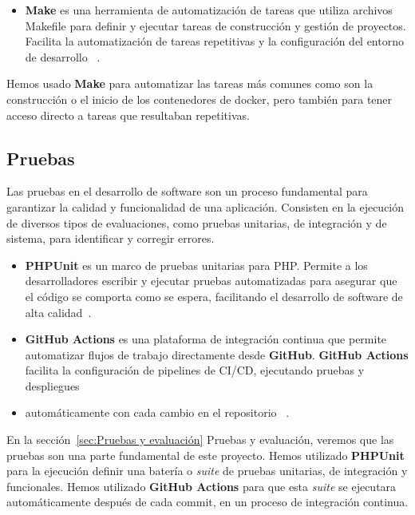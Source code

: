 \begin{itemize}
    \item \textbf{Make}
    es una herramienta de automatización de tareas que utiliza archivos Makefile para definir y ejecutar tareas de
    construcción y gestión de proyectos.
    Facilita la automatización de tareas repetitivas y la configuración del entorno de desarrollo
    ~\cite{https://www.gnu.org/software/make/manual/}.
\end{itemize}

Hemos usado \textbf{Make} para automatizar las tareas más comunes como son la construcción o el inicio de los
contenedores de docker, pero también para tener acceso directo a tareas que resultaban repetitivas.

\subsection*{Pruebas}

Las pruebas en el desarrollo de software son un proceso fundamental para garantizar la calidad y funcionalidad de una
aplicación.
Consisten en la ejecución de diversos tipos de evaluaciones, como pruebas unitarias, de integración y de sistema, para
identificar y corregir errores.

\begin{itemize}
    \item \textbf{PHPUnit} es un marco de pruebas unitarias para PHP. Permite a los desarrolladores escribir y
    ejecutar pruebas automatizadas para asegurar que el código se comporta como se espera, facilitando el desarrollo de
    software de alta calidad~\cite{https://phpunit.de/manual/current/en/}.
    \item \textbf{GitHub Actions} es una plataforma de integración continua que permite automatizar flujos de
    trabajo directamente desde \textbf{GitHub}.
    \textbf{GitHub Actions} facilita la configuración de pipelines de CI/CD, ejecutando pruebas y despliegues
    \item automáticamente con cada cambio en el repositorio ~\cite{https://docs.github.com/en/actions}.
\end{itemize}

En la sección~\ref{sec:Pruebas y evaluación} Pruebas y evaluación, veremos que las pruebas son una parte fundamental de
este proyecto.
Hemos utilizado \textbf{PHPUnit} para la ejecución definir una batería o \textit{suite} de pruebas unitarias, de
integración y funcionales.
Hemos utilizado \textbf{GitHub Actions} para que esta \textit{suite} se ejecutara automáticamente después de cada
commit, en un proceso de integración continua.

